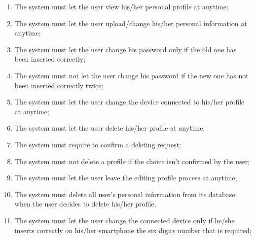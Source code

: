 \begin{enumerate}
  \item The system must let the user view his/her personal profile at anytime;
  \item The system must let the user upload/change his/her personal information at anytime;
  \item The system must let the user change his password only if the old one has been inserted correctly;
  \item The system must not let the user change his password if the new one has not been inserted correctly twice;
  \item The system must let the user change the device connected to his/her profile at anytime;
  \item The system must let the user delete his/her profile at anytime;
  \item The system must require to confirm a deleting request;
  \item The system must not delete a profile if the choice isn't confirmed by the user;
  \item The system must let the user leave the editing profile process at anytime;
  \item The system must delete all user's personal information from its database when the user decides to delete his/her profile;
  \item The system must let the user change the connected device only if he/she inserts correctly on his/her smartphone the six digits number that is required;
\end{enumerate}

